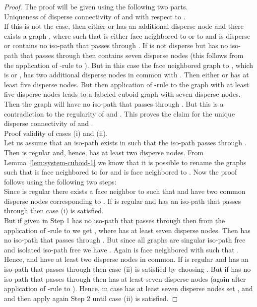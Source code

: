 \documentclass[a4paper,11pt]{article}
\begin{document}
\begin{proof}
The proof will be given using the following two parts.\\

 Uniqueness of disperse connectivity of  and  with respect to .\\

If this is not the case, then either  or  has an additional disperse node
and there exists a graph , where  such that
 is either face neighbored to  or to  and  is disperse or  contains
no iso-path that passes through . If  is not disperse but has no iso-path that passes through 
then  contains seven disperse nodes (this follows from the application of -rule to ). But
in this case the face neighbored graph to , which is  or , has
two additional disperse nodes in common with . Then either  or  has at
least five disperse nodes. But then application of -rule to the graph with at least five disperse
nodes leads to a labeled cuboid graph with seven disperse nodes. Then the graph will have no iso-path that
passes through . But this is a contradiction to the regularity of  and .
This proves the claim for the unique disperse connectivity of  and .\\

 Proof validity of cases (i) and (ii).\\

Let us assume that an iso-path  exists in  such that the iso-path passes
through . Then  is regular and, hence,  has at least two disperse nodes.
From Lemma~\ref{lem:system-cuboid-1} we know that it is possible to rename the graphs 
such that  is face neighbored to  for  and  is face neighbored
to . Now the proof follows using the following two steps:\\

 Since  is regular there exists a face neighbor
 to  such that  and  have two common disperse
nodes corresponding to . If  is regular and has an iso-path that passes through  then case (i)
is satisfied.\\

 But if  given in Step 1 has no iso-path that passes through  then from the
application of -rule to  we get , where  has at least seven disperse nodes.
Then  has no iso-path that passes through . But since all graphs  are
singular iso-path free and isolated iso-path free we have . Again  is face neighbored
with  such that . Hence,  and  have at least
two disperse nodes in common. If  is regular and has an iso-path that passes through  then case
(ii) is satisfied by choosing . But if  has no iso-path that passes through  then
 has at least seven disperse nodes (again after application of -rule to ). Hence, in
case  has at least seven disperse nodes set , and  and then apply again
Step 2 until case (ii) is satisfied.


\end{proof}
\end{document}
